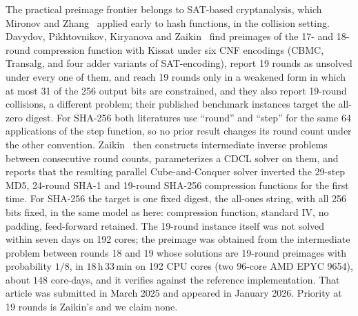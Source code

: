 \documentclass[11pt,a4paper]{article}
\begin{document}
The practical preimage frontier belongs to SAT-based cryptanalysis, which Mironov and Zhang~\cite{MironovZhang2006} applied early to hash functions, in the collision setting.  Davydov, Pikh\-tov\-ni\-kov,
Kir\-ya\-no\-va and Zaikin~\cite{Davydov2025} find preimages of the 17- and 18-round
compression function with Kissat under six CNF encodings (CBMC, Transalg, and four adder variants of SAT-encoding), report 19 rounds as unsolved under every one of them, and reach 19 rounds only in a weakened
form in which at most 31 of the 256 output bits are constrained, and they also report 19-round collisions, a different problem; their published benchmark instances target the all-zero digest.  For SHA-256 both literatures use ``round'' and ``step'' for the same 64 applications of the step function, so no prior result changes its round count under the other convention.
Zaikin~\cite{Zaikin2026} then constructs intermediate inverse problems
between consecutive round counts, parameterizes a CDCL solver on them, and
reports that the resulting parallel Cube-and-Conquer solver inverted the
29-step MD5, 24-round SHA-1 and 19-round SHA-256 compression functions for
the first time.  For SHA-256 the target is one fixed digest, the all-ones
string, with all 256 bits fixed, in the same model as here: compression
function, standard IV, no padding, feed-forward retained.  The 19-round
instance itself was not solved within seven days on 192 cores; the preimage
was obtained from the intermediate problem between rounds 18 and 19 whose
solutions are 19-round preimages with probability $1/8$, in
$18$\,h\,$33$\,min on 192 CPU cores (two 96-core AMD EPYC 9654), about
$148$ core-days, and it verifies against the reference implementation.
That article was submitted in March 2025 and appeared in January 2026.
Priority at 19 rounds is Zaikin's and we claim none.
\end{document}
